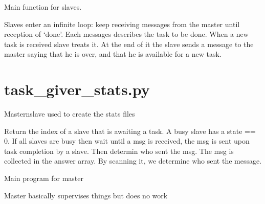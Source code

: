 \documentclass[letterpaper,10pt,english]{sphinxmanual}
\begin{document}

\begin{fulllineitems}
\label{\detokenize{pargopy:pargopy.task_giver.slave_work_nonblocking}}
Main function for slaves.

Slaves enter an infinite loop: keep receiving messages from the
master until reception of ‘done’. Each messages describes the task
to be done. When a new task is received slave treats it. At the
end of it the slave sends a message to the master saying that he
is over, and that he is available for a new task.

\end{fulllineitems}



\section{task\_giver\_stats.py}
\label{\detokenize{pargopy:task-giver-stats-py}}\label{\detokenize{pargopy:module-pargopy.task_giver_stats}}
Masternslave used to create the stats files

\begin{fulllineitems}
\label{\detokenize{pargopy:pargopy.task_giver_stats.getavailableslave}}
Return the index of a slave that is awaiting a task.  A busy slave
has a state == 0. If all slaves are busy then wait until a msg is
received, the msg is sent upon task completion by a slave. Then
determin who sent the msg. The msg is collected in the answer
array. By scanning it, we determine who sent the message.

\end{fulllineitems}


\begin{fulllineitems}
\label{\detokenize{pargopy:pargopy.task_giver_stats.master_work_nonblocking}}
Main program for master

Master basically supervises things but does no work

\end{fulllineitems}
\end{document}
